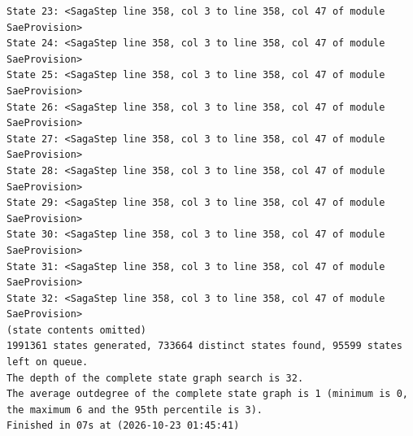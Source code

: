 \documentclass[11pt,a4paper]{article}
\begin{document}
\begin{lstlisting}[float, caption={mutations/mut\_d\_noseen.cfg result}, captionpos=t, label={lst:tlc-mut-d-noseen}]
State 23: <SagaStep line 358, col 3 to line 358, col 47 of module SaeProvision>
State 24: <SagaStep line 358, col 3 to line 358, col 47 of module SaeProvision>
State 25: <SagaStep line 358, col 3 to line 358, col 47 of module SaeProvision>
State 26: <SagaStep line 358, col 3 to line 358, col 47 of module SaeProvision>
State 27: <SagaStep line 358, col 3 to line 358, col 47 of module SaeProvision>
State 28: <SagaStep line 358, col 3 to line 358, col 47 of module SaeProvision>
State 29: <SagaStep line 358, col 3 to line 358, col 47 of module SaeProvision>
State 30: <SagaStep line 358, col 3 to line 358, col 47 of module SaeProvision>
State 31: <SagaStep line 358, col 3 to line 358, col 47 of module SaeProvision>
State 32: <SagaStep line 358, col 3 to line 358, col 47 of module SaeProvision>
(state contents omitted)
1991361 states generated, 733664 distinct states found, 95599 states left on queue.
The depth of the complete state graph search is 32.
The average outdegree of the complete state graph is 1 (minimum is 0, the maximum 6 and the 95th percentile is 3).
Finished in 07s at (2026-10-23 01:45:41)
\end{lstlisting}
\bigskip
\end{document}
